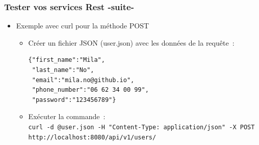 \documentclass{beamer}
\begin{document}
\begin{frame}[fragile]
\frametitle{Tester vos services Rest -suite-}
\begin{itemize}		
		
	\item Exemple avec curl pour la méthode POST		
		\begin{itemize}
			\item Créer un fichier JSON (user.json) avec les données de la requête~:
\begin{lstlisting}
{"first_name":"Mila",
 "last_name":"No",
 "email":"mila.no@github.io",
 "phone_number":"06 62 34 00 99",
 "password":"123456789"}
\end{lstlisting}
			\item Exécuter la commande~: \\ \scriptsize
			\texttt{curl -d @user.json -H "Content-Type: application/json" -X POST http://localhost:8080/api/v1/users/}
			\normalsize
		\end{itemize}
		
	\end{itemize}
\end{frame} 

%		
\end{document}
